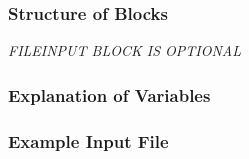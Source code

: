 \vspace{5mm}
\subsubsection{Structure of Blocks}


\vspace{5mm}
\noindent \textit{FILEINPUT BLOCK IS OPTIONAL}


\vspace{5mm}
\subsubsection{Explanation of Variables}
\begin{description}

\end{description}

\vspace{5mm}
\subsubsection{Example Input File}





